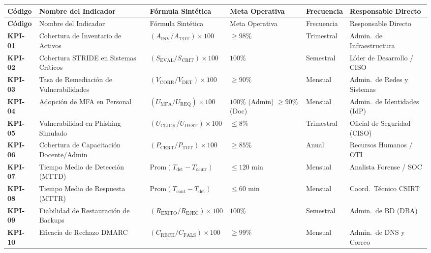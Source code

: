 \begin{center}
\scriptsize
\setlength{\tabcolsep}{3pt}
\renewcommand{\arraystretch}{1.25}
\begin{longtable}{>{\bfseries}p{1.2cm} p{3.5cm} p{3.0cm} p{1.8cm} p{1.5cm} p{3.2cm}}
\toprule
\rowcolor{outermarginbgcolor}
Código & Nombre del Indicador & Fórmula Sintética & Meta Operativa & Frecuencia & Responsable Directo \\
\midrule
\endfirsthead
\toprule
\rowcolor{outermarginbgcolor}
Código & Nombre del Indicador & Fórmula Sintética & Meta Operativa & Frecuencia & Responsable Directo \\
\midrule
\endhead
\bottomrule
\endfoot
KPI-01 & Cobertura de Inventario de Activos & $(A_{\text{INV}} / A_{\text{TOT}}) \times 100$ & $\ge 98\%$ & Trimestral & Admin.\ de Infraestructura \\
\midrule
KPI-02 & Cobertura STRIDE en Sistemas Críticos & $(S_{\text{EVAL}} / S_{\text{CRIT}}) \times 100$ & $100\%$ & Semestral & Líder de Desarrollo / CISO \\
\midrule
KPI-03 & Tasa de Remediación de Vulnerabilidades & $(V_{\text{CORR}} / V_{\text{DET}}) \times 100$ & $\ge 90\%$ & Mensual & Admin.\ de Redes y Sistemas \\
\midrule
KPI-04 & Adopción de MFA en Personal & $(U_{\text{MFA}} / U_{\text{REQ}}) \times 100$ & $100\%$ (Admin) \newline $\ge 90\%$ (Doc) & Mensual & Admin.\ de Identidades (IdP) \\
\midrule
KPI-05 & Vulnerabilidad en Phishing Simulado & $(U_{\text{CLICK}} / U_{\text{DEST}}) \times 100$ & $\le 8\%$ & Trimestral & Oficial de Seguridad (CISO) \\
\midrule
KPI-06 & Cobertura de Capacitación Docente/Admin & $(P_{\text{CERT}} / P_{\text{TOT}}) \times 100$ & $\ge 85\%$ & Anual & Recursos Humanos / OTI \\
\midrule
KPI-07 & Tiempo Medio de Detección (MTTD) & $\text{Prom}(T_{\text{det}} - T_{\text{ocurr}})$ & $\le 120\text{ min}$ & Mensual & Analista Forense / SOC \\
\midrule
KPI-08 & Tiempo Medio de Respuesta (MTTR) & $\text{Prom}(T_{\text{cont}} - T_{\text{det}})$ & $\le 60\text{ min}$ & Mensual & Coord.\ Técnico CSIRT \\
\midrule
KPI-09 & Fiabilidad de Restauración de Backups & $(R_{\text{EXITO}} / R_{\text{EJEC}}) \times 100$ & $100\%$ & Semestral & Admin.\ de BD (DBA) \\
\midrule
KPI-10 & Eficacia de Rechazo DMARC & $(C_{\text{RECH}} / C_{\text{FALS}}) \times 100$ & $\ge 99\%$ & Mensual & Admin.\ de DNS y Correo \\
\bottomrule
\end{longtable}
\end{center}